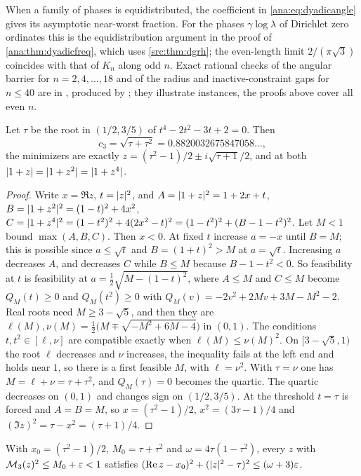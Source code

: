 When a family of phases is equidistributed, the coefficient in \eqref{ana:eq:dyadicangle}
gives its asymptotic near-worst fraction. For the phases $\gamma\log\lambda$ of Dirichlet
zero ordinates this is the equidistribution argument in the proof of
\cref{ana:thm:dyadicfreq}, which uses \cref{src:thm:dgrh}; the even-length limit
$2/(\pi\sqrt3)$ coincides with that of $K_n$ along odd $n$. Exact rational checks of the
angular barrier for $n=2,4,\dots,18$ and of the radius and inactive-constraint gaps for
$n\le40$ are in ,
produced by ; they
illustrate instances, the proofs above cover all even $n$.

\begin{theorem}\label{ana:thm:dyadicthree}
Let $\tau$ be the root in $(1/2,3/5)$ of $t^4-2t^2-3t+2=0$. Then
\[
 c_3=\sqrt{\tau+\tau^2}=0.8820032675847058\ldots,
\]
the minimizers are exactly $z=(\tau^2-1)/2\pm i\sqrt{\tau+1}/2$, and at both
$\lvert1+z\rvert=\lvert1+z^2\rvert=\lvert1+z^4\rvert$.
\end{theorem}

\begin{proof}
Write $x=\Re z$, $t=\lvert z\rvert^2$, and $A=\lvert1+z\rvert^2=1+2x+t$, $B=\lvert1+z^2\rvert^2=(1-t)^2+4x^2$,
$C=\lvert1+z^4\rvert^2=(1-t^2)^2+4(2x^2-t)^2=(1-t^2)^2+(B-1-t^2)^2$. Let $M<1$ bound
$\max(A,B,C)$. Then $x<0$. At fixed $t$ increase $a=-x$ until $B=M$; this is possible since
$a\le\sqrt t$ and $B=(1+t)^2>M$ at $a=\sqrt t$. Increasing $a$ decreases $A$, and decreases
$C$ while $B\le M$ because $B-1-t^2<0$. So feasibility at $t$ is feasibility at
$a=\frac12\sqrt{M-(1-t)^2}$, where $A\le M$ and $C\le M$ become $Q_M(t)\ge0$ and
$Q_M(t^2)\ge0$ with $Q_M(v)=-2v^2+2Mv+3M-M^2-2$. Real roots need $M\ge3-\sqrt5$, and then
they are $\ell(M),\nu(M)=\frac12\bigl(M\mp\sqrt{-M^2+6M-4}\bigr)$ in $(0,1)$. The conditions
$t,t^2\in[\ell,\nu]$ are compatible exactly when $\ell(M)\le\nu(M)^2$. On
$[3-\sqrt5,1)$ the root $\ell$ decreases and $\nu$ increases, the inequality fails at the
left end and holds near $1$, so there is a first feasible $M$, with $\ell=\nu^2$. With
$\tau=\nu$ one has $M=\ell+\nu=\tau+\tau^2$, and $Q_M(\tau)=0$ becomes the quartic. The
quartic decreases on $(0,1)$ and changes sign on $(1/2,3/5)$. At the threshold $t=\tau$ is
forced and $A=B=M$, so $x=(\tau^2-1)/2$, $x^2=(3\tau-1)/4$ and
$(\Im z)^2=\tau-x^2=(\tau+1)/4$.
\end{proof}

\begin{proposition}\label{ana:prop:three}
With $x_0=(\tau^2-1)/2$, $M_0=\tau+\tau^2$ and $\omega=4\tau(1-\tau^2)$, every $z$ with
$\mathcal{M}_3(z)^2\le M_0+\varepsilon<1$ satisfies
$(\operatorname{Re} z-x_0)^2+(\lvert z\rvert^2-\tau)^2\le(\omega+3)\varepsilon$.
\end{proposition}

